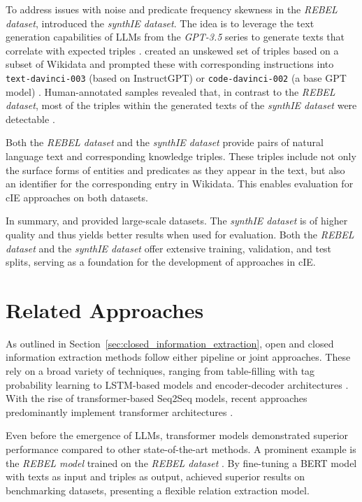 \documentclass[a4paper,oneside,bibliography=totoc]{scrbook}
\begin{document}
To address issues with noise and predicate frequency skewness in the \textit{REBEL dataset}, \citet{Josifoski2023} introduced the \textit{synthIE dataset}. The idea is to leverage the text generation capabilities of \acp{LLM} from the \textit{GPT-3.5} series to generate texts that correlate with expected triples \cite{Josifoski2023}. \citet{Josifoski2023} created an unskewed set of triples based on a subset of Wikidata and prompted these with corresponding instructions into \texttt{text-davinci-003} (based on InstructGPT) or \texttt{code-davinci-002} (a base GPT model) \cite{Josifoski2023,OpenAI2025a}. Human-annotated samples revealed that, in contrast to the \textit{REBEL dataset}, most of the triples within the generated texts of the \textit{synthIE dataset} were detectable \cite{Josifoski2023}.

Both the \textit{REBEL dataset} and the \textit{synthIE dataset} provide pairs of natural language text and corresponding knowledge triples. These triples include not only the surface forms of entities and predicates as they appear in the text, but also an identifier for the corresponding entry in Wikidata. This enables evaluation for \ac{cIE} approaches on both datasets.

In summary, \citet{HuguetCabot2021} and \citet{Josifoski2023} provided large-scale datasets. The \textit{synthIE dataset} is of higher quality and thus yields better results when used for evaluation. Both the \textit{REBEL dataset} and the \textit{synthIE dataset} offer extensive training, validation, and test splits, serving as a foundation for the development of approaches in \ac{cIE}.

\section{Related Approaches}
\label{sec:related_approaches}

As outlined in Section~\ref{sec:closed_information_extraction}, open and closed information extraction methods follow either pipeline or joint approaches. These rely on a broad variety of techniques, ranging from table-filling with tag probability learning to LSTM-based models and encoder-decoder architectures \cite{Zhang2022,Angeli2015,Trisedya2019}. With the rise of transformer-based Seq2Seq models, recent approaches predominantly implement transformer architectures \cite{Josifoski2021,Josifoski2023,Moeller2024}.

Even before the emergence of \acp{LLM}, transformer models demonstrated superior performance compared to other state-of-the-art methods. A prominent example is the \textit{REBEL model} trained on the \textit{REBEL dataset} \cite{HuguetCabot2021}. By fine-tuning a BERT model with texts as input and triples as output, \citet{HuguetCabot2021} achieved superior results on benchmarking datasets, presenting a flexible relation extraction model.
\end{document}
